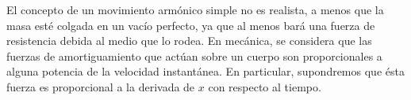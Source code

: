 \documentclass{beamer}
\begin{document}
\frame{\titlepage}

\begin{frame}[t]
	\begin{block}{}
		El concepto de un movimiento armónico simple no es realista, a menos que la masa esté colgada en un vacío perfecto, ya que al menos bará una fuerza de resistencia debida al medio que lo rodea.
		En mecánica, se considera que las fuerzas de amortiguamiento que actúan sobre un cuerpo son proporcionales a alguna potencia de la velocidad instantánea.
		En particular, supondremos que ésta fuerza es proporcional a la derivada de \(x\) con respecto al tiempo.
	\end{block}
\end{frame}
\end{document}
